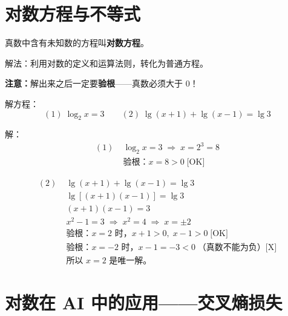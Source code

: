 \section{对数方程与不等式}

\begin{definitionbox}[对数方程]
真数中含有未知数的方程叫\textbf{对数方程}。

解法：利用对数的定义和运算法则，转化为普通方程。

\textbf{注意：}解出来之后一定要\textbf{验根}——真数必须大于 0！
\end{definitionbox}

\begin{examplebox}[10——解对数方程]
解方程：
\[
(1)\; \log_2 x = 3 \qquad (2)\; \lg(x+1) + \lg(x-1) = \lg 3
\]

解：
\[
\begin{aligned}
(1)&\; \log_2 x = 3 \;\Longrightarrow\; x = 2^3 = 8 \\
   &\;\text{验根：} x = 8 > 0 \;\text{[OK]}
\end{aligned}
\]

\[
\begin{aligned}
(2)&\; \lg(x+1) + \lg(x-1) = \lg 3 \\
   &\;\lg[(x+1)(x-1)] = \lg 3 \\
   &\;(x+1)(x-1) = 3 \\
   &\;x^2 - 1 = 3 \;\Longrightarrow\; x^2 = 4 \;\Longrightarrow\; x = \pm 2 \\
   &\;\text{验根：} x = 2 \text{ 时，} x+1 > 0,\; x-1 > 0 \;\text{[OK]} \\
   &\;\text{验根：} x = -2 \text{ 时，} x-1 = -3 < 0 \;\text{（真数不能为负）[X]} \\
   &\;\text{所以 } x = 2 \text{ 是唯一解。}
\end{aligned}
\]
\end{examplebox}


\section{对数在 AI 中的应用——交叉熵损失}

